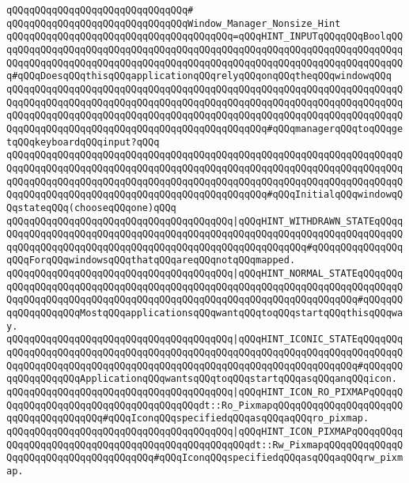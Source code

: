 \verb|qQQqqQQqqQQqqQQqqQQqqQQqqQQqqQQq#|\newline
\verb|qQQqqQQqqQQqqQQqqQQqqQQqqQQqqQQqWindow_Manager_Nonsize_Hint|\newline
\verb|qQQqqQQqqQQqqQQqqQQqqQQqqQQqqQQqqQQqqQQq=qQQqHINT_INPUTqQQqqQQqBoolqQQqqQQqqQQqqQQqqQQqqQQqqQQqqQQqqQQqqQQqqQQqqQQqqQQqqQQqqQQqqQQqqQQqqQQqqQQqqQQqqQQqqQQqqQQqqQQqqQQqqQQqqQQqqQQqqQQqqQQqqQQqqQQqqQQqqQQqqQQqqQQq#qQQqDoesqQQqthisqQQqapplicationqQQqrelyqQQqonqQQqtheqQQqwindowqQQq|\newline
\verb|qQQqqQQqqQQqqQQqqQQqqQQqqQQqqQQqqQQqqQQqqQQqqQQqqQQqqQQqqQQqqQQqqQQqqQQqqQQqqQQqqQQqqQQqqQQqqQQqqQQqqQQqqQQqqQQqqQQqqQQqqQQqqQQqqQQqqQQqqQQqqQQqqQQqqQQqqQQqqQQqqQQqqQQqqQQqqQQqqQQqqQQqqQQqqQQqqQQqqQQqqQQqqQQqqQQqqQQqqQQqqQQqqQQqqQQqqQQqqQQqqQQqqQQqqQQqqQQq#qQQqmanagerqQQqtoqQQqgetqQQqkeyboardqQQqinput?qQQq|\newline
\verb|qQQqqQQqqQQqqQQqqQQqqQQqqQQqqQQqqQQqqQQqqQQqqQQqqQQqqQQqqQQqqQQqqQQqqQQqqQQqqQQqqQQqqQQqqQQqqQQqqQQqqQQqqQQqqQQqqQQqqQQqqQQqqQQqqQQqqQQqqQQqqQQqqQQqqQQqqQQqqQQqqQQqqQQqqQQqqQQqqQQqqQQqqQQqqQQqqQQqqQQqqQQqqQQqqQQqqQQqqQQqqQQqqQQqqQQqqQQqqQQqqQQqqQQqqQQqqQQq#qQQqInitialqQQqwindowqQQqstateqQQq(chooseqQQqone)qQQq|\newline
\verb|qQQqqQQqqQQqqQQqqQQqqQQqqQQqqQQqqQQqqQQq|\verb#|qQQqHINT_WITHDRAWN_STATEqQQqqQQqqQQqqQQqqQQqqQQqqQQqqQQqqQQqqQQqqQQqqQQqqQQqqQQqqQQqqQQqqQQqqQQqqQQqqQQqqQQqqQQqqQQqqQQqqQQqqQQqqQQqqQQqqQQqqQQqqQQqqQQq#\verb|#qQQqqQQqqQQqqQQqqQQqForqQQqwindowsqQQqthatqQQqareqQQqnotqQQqmapped.|\newline
\verb|qQQqqQQqqQQqqQQqqQQqqQQqqQQqqQQqqQQqqQQq|\verb#|qQQqHINT_NORMAL_STATEqQQqqQQqqQQqqQQqqQQqqQQqqQQqqQQqqQQqqQQqqQQqqQQqqQQqqQQqqQQqqQQqqQQqqQQqqQQqqQQqqQQqqQQqqQQqqQQqqQQqqQQqqQQqqQQqqQQqqQQqqQQqqQQqqQQqqQQqqQQq#\verb|#qQQqqQQqqQQqqQQqqQQqMostqQQqapplicationsqQQqwantqQQqtoqQQqstartqQQqthisqQQqway.|\newline
\verb|qQQqqQQqqQQqqQQqqQQqqQQqqQQqqQQqqQQqqQQq|\verb#|qQQqHINT_ICONIC_STATEqQQqqQQqqQQqqQQqqQQqqQQqqQQqqQQqqQQqqQQqqQQqqQQqqQQqqQQqqQQqqQQqqQQqqQQqqQQqqQQqqQQqqQQqqQQqqQQqqQQqqQQqqQQqqQQqqQQqqQQqqQQqqQQqqQQqqQQqqQQq#\verb|#qQQqqQQqqQQqqQQqqQQqApplicationqQQqwantsqQQqtoqQQqstartqQQqasqQQqanqQQqicon.|\newline
\verb|qQQqqQQqqQQqqQQqqQQqqQQqqQQqqQQqqQQqqQQq|\verb#|qQQqHINT_ICON_RO_PIXMAPqQQqqQQqqQQqqQQqqQQqqQQqqQQqqQQqqQQqqQQqdt::Ro_PixmapqQQqqQQqqQQqqQQqqQQqqQQqqQQqqQQqqQQqqQQq#\verb|#qQQqIconqQQqspecifiedqQQqasqQQqaqQQqro_pixmap.|\newline
\verb|qQQqqQQqqQQqqQQqqQQqqQQqqQQqqQQqqQQqqQQq|\verb#|qQQqHINT_ICON_PIXMAPqQQqqQQqqQQqqQQqqQQqqQQqqQQqqQQqqQQqqQQqqQQqqQQqqQQqdt::Rw_PixmapqQQqqQQqqQQqqQQqqQQqqQQqqQQqqQQqqQQqqQQq#\verb|#qQQqIconqQQqspecifiedqQQqasqQQqaqQQqrw_pixmap.|\newline
